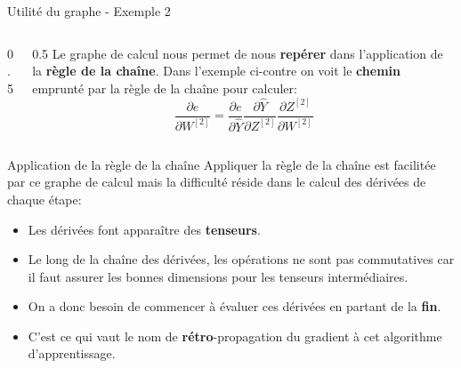 \begin{frame}{Utilité du graphe - Exemple 2}
\begin{columns}
\begin{column}{0.5\textwidth}
\begin{center}
{\begin{tikzpicture}
					\end{tikzpicture}
				}
			\end{center}
		\end{column}
		\begin{column}{0.5\textwidth}
			Le graphe de calcul nous permet de nous \textbf{repérer} dans l'application de la \textbf{règle de la chaîne}. Dans l'exemple ci-contre on voit le \textbf{chemin} emprunté par la règle de la chaîne pour calculer:
			\begin{equation*}
				\frac{\partial{e}}{\partial{W^{[2]}}} = \frac{\partial{e}}{\partial{\hat{Y}}} \frac{\partial{\hat{Y}}}{\partial{Z^{[2]}}} \frac{\partial{Z^{[2]}}}{\partial{W^{[2]}}}
			\end{equation*}
		\end{column}
	\end{columns}
\end{frame}

\begin{frame}{Application de la règle de la chaîne}
	Appliquer la règle de la chaîne est facilitée par ce graphe de calcul mais la difficulté réside dans le calcul des dérivées de chaque étape:
	\begin{itemize}
		\pause
		\item Les dérivées font apparaître des \textbf{tenseurs}.
		\pause
		\item Le long de la chaîne des dérivées, les opérations ne sont pas commutatives car il faut assurer les bonnes dimensions pour les tenseurs intermédiaires.
		\pause
		\item On a donc besoin de commencer à évaluer ces dérivées en partant de la \textbf{fin}.
		\pause
		\item C'est ce qui vaut le nom de \textbf{rétro}-propagation du gradient à cet algorithme d'apprentissage.
	\end{itemize}
\end{frame}

